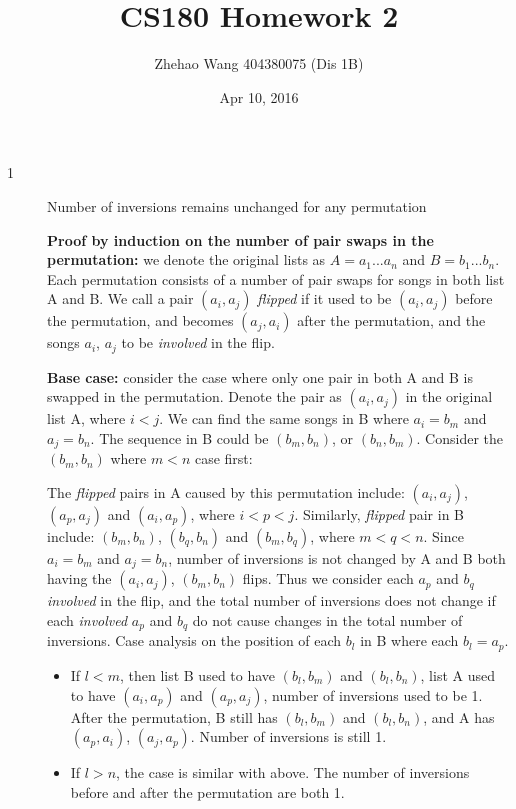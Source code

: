 \documentclass{article}
\title{CS180 Homework 2}
\author{Zhehao Wang 404380075 (Dis 1B)}
\date{Apr 10, 2016}
\begin{document}
\maketitle

\begin{description}

\item[1]{Number of inversions remains unchanged for any permutation}
  
  \textbf{Proof by induction on the number of pair swaps in the permutation:} we denote the original lists as $A = {a_1...a_n}$ and $B = {b_1...b_n}$. Each permutation consists of a number of pair swaps for songs in both list A and B. We call a pair $(a_i, a_j)$ \textit{flipped} if it used to be $(a_i, a_j)$ before the permutation, and becomes $(a_j, a_i)$ after the permutation, and the songs $a_i$, $a_j$ to be \textit{involved} in the flip.

  \textbf{Base case:} consider the case where only one pair in both A and B is swapped in the permutation. Denote the pair as $(a_i, a_j)$ in the original list A, where $i < j$. We can find the same songs in B where $a_i = b_m$ and $a_j = b_n$. The sequence in B could be $(b_m, b_n)$, or $(b_n, b_m)$. Consider the $(b_m, b_n)$ where $m < n$ case first:

  The \textit{flipped} pairs in A caused by this permutation include: $(a_i, a_j)$, $(a_p, a_j)$ and $(a_i, a_p)$, where $i < p < j$. Similarly, \textit{flipped} pair in B include: $(b_m, b_n)$, $(b_q, b_n)$ and $(b_m, b_q)$, where $m < q < n$. Since $a_i = b_m$ and $a_j = b_n$, number of inversions is not changed by A and B both having the $(a_i, a_j)$, $(b_m, b_n)$ flips. Thus we consider each $a_p$ and $b_q$ \textit{involved} in the flip, and the total number of inversions does not change if each \textit{involved} $a_p$ and $b_q$ do not cause changes in the total number of inversions. Case analysis on the position of each $b_l$ in B where each $b_l = a_p$.
  
  \begin{itemize}
  \item
  If $l < m$, then list B used to have $(b_l, b_m)$ and $(b_l, b_n)$, list A used to have $(a_i, a_p)$ and $(a_p, a_j)$, number of inversions used to be 1. After the permutation, B still has $(b_l, b_m)$ and $(b_l, b_n)$, and A has $(a_p, a_i)$, $(a_j, a_p)$. Number of inversions is still 1.

  \item
  If $l > n$, the case is similar with above. The number of inversions before and after the permutation are both 1.


\end{itemize}
\end{description}
\end{document}

